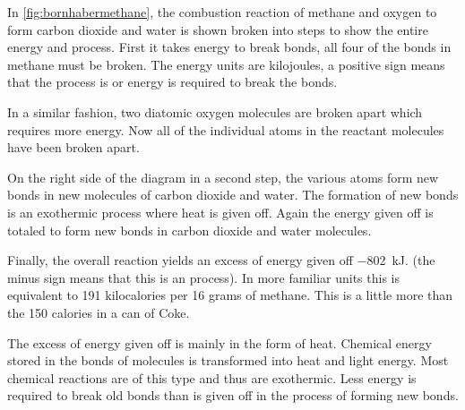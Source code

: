 In \cref{fig:bornhabermethane}, the combustion reaction of methane and oxygen to form carbon dioxide and water is shown broken into steps to show the entire energy  and  process. First it takes energy to break bonds, all four of the  bonds in methane must be broken. The energy units are kilojoules, a positive sign means that the process is  or energy is required to break the bonds.

In a similar fashion, two diatomic oxygen molecules are broken apart which requires more energy. Now all of the individual atoms in the reactant molecules have been broken apart.

On the right side of the diagram in a second step, the various atoms form new bonds in new molecules of carbon dioxide and water. The formation of new bonds is an exothermic process where heat is given off. Again the energy given off is totaled to form new bonds in carbon dioxide and water molecules.

Finally, the overall reaction yields an excess of energy given off \SI{-802}{kJ}. (the minus sign means that this is an  process). In more familiar units this is equivalent to 191 kilocalories per 16 grams of methane. This is a little more than the 150 calories in a can of Coke.

The excess of energy given off is mainly in the form of heat. Chemical energy stored in the bonds of molecules is transformed into heat and light energy. Most chemical reactions are of this type and thus are exothermic. Less energy is required to break old bonds than is given off in the process of forming new bonds.

